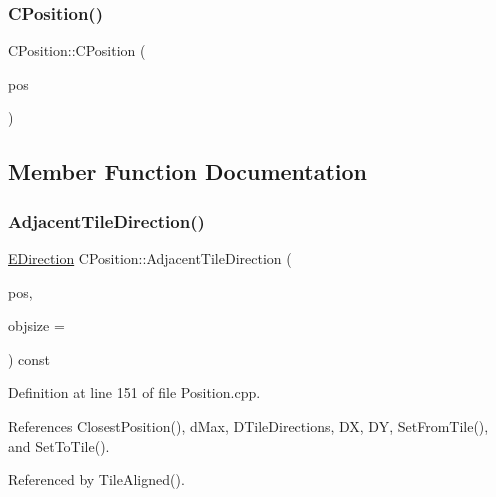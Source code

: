 \subsubsection{\texorpdfstring{C\+Position()}{CPosition()}\hspace{0.1cm}{\footnotesize\ttfamily [3/3]}}
{\footnotesize\ttfamily C\+Position\+::\+C\+Position (\begin{DoxyParamCaption}\item[{const \hyperlink{classCPosition}{C\+Position} \&}]{pos }\end{DoxyParamCaption})\hspace{0.3cm}{\ttfamily [default]}}



\subsection{Member Function Documentation}
\hypertarget{classCPosition_a2295901e4c35cfc81304f9a217e34ac7}{}\label{classCPosition_a2295901e4c35cfc81304f9a217e34ac7} 
\subsubsection{\texorpdfstring{Adjacent\+Tile\+Direction()}{AdjacentTileDirection()}}
{\footnotesize\ttfamily \hyperlink{GameDataTypes_8h_acb2b033915f6659a71a38b5aa6e4eb42}{E\+Direction} C\+Position\+::\+Adjacent\+Tile\+Direction (\begin{DoxyParamCaption}\item[{const \hyperlink{classCPosition}{C\+Position} \&}]{pos,  }\item[{int}]{objsize = {} }\end{DoxyParamCaption}) const}



Definition at line 151 of file Position.\+cpp.



References Closest\+Position(), d\+Max, D\+Tile\+Directions, DX, DY, Set\+From\+Tile(), and Set\+To\+Tile().



Referenced by Tile\+Aligned().


